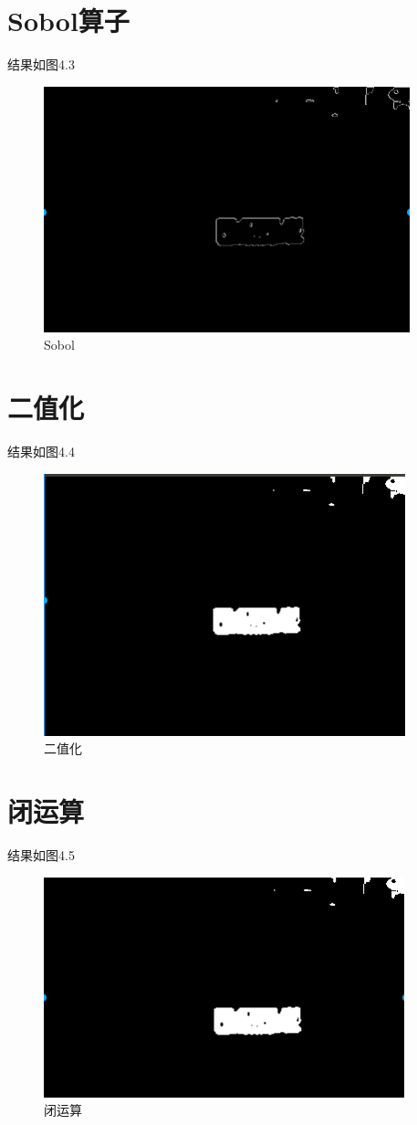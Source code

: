 \section{Sobol算子}
结果如图4.3
\begin{figure}[h]
	\centering
	\includegraphics[scale=0.5]{figures/12.png}
	\caption{Sobol}
	\label{fig:2}
\end{figure}

\section{二值化}
结果如图4.4
\begin{figure}[h]
	\centering
	\includegraphics[scale=0.5]{figures/13.png}
	\caption{二值化}
	\label{fig:2}
\end{figure}

\section{闭运算}
结果如图4.5
\begin{figure}[h]
	\centering
	\includegraphics[scale=0.5]{figures/14.png}
	\caption{闭运算}
	\label{fig:2}
\end{figure}

